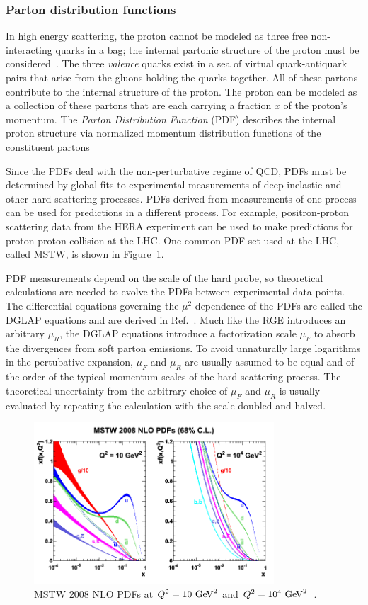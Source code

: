 \subsubsection{Parton distribution functions}

In high energy scattering, the proton cannot be modeled as three free non-interacting quarks in a bag; the internal partonic structure of the proton must be considered~\cite{PDG,Campbell:2006wx}. The three \emph{valence} quarks exist in a sea of virtual quark-antiquark pairs that arise from the gluons holding the quarks together. All of these partons contribute to the internal structure of the proton. The proton can be modeled as a collection of these partons that are each carrying a fraction $x$ of the proton's momentum. The \emph{Parton Distribution Function} (PDF) describes the internal proton structure via normalized momentum distribution functions of the constituent partons

 Since the PDFs deal with the non-perturbative regime of QCD, PDFs must be determined by global fits to experimental measurements of deep inelastic and other hard-scattering processes. PDFs derived from measurements of one process can be used for predictions in a different process. For example, positron-proton scattering data from the HERA experiment can be used to make predictions for proton-proton collision at the LHC. One common PDF set used at the LHC, called MSTW, is shown in Figure~\ref{fig:mstw}.

PDF measurements depend on the scale of the hard probe, so theoretical calculations are needed to evolve the PDFs between experimental data points. The differential equations governing the $\mu^2$ dependence of the PDFs are called the DGLAP equations and are derived in Ref.~\cite{Altarelli:1977zs}. Much like the RGE introduces an arbitrary $\mu_R$, the DGLAP equations introduce a factorization scale $\mu_F$ to absorb the divergences from soft parton emissions. To avoid unnaturally large logarithms in the pertubative expansion,  $\mu_F$ and $\mu_R$ are usually assumed to be equal and of the order of the typical momentum scales of the hard scattering process. The theoretical uncertainty from the arbitrary choice of $\mu_F$ and $\mu_R$ is usually evaluated by repeating the calculation with the scale doubled and halved.
\begin{figure}[h]
\centering
\includegraphics[width=0.8\textwidth]{fig/thry/mstw.png}
\caption{MSTW 2008 NLO PDFs at $Q^2= 10 \gev^2$ and $Q^2= 10^4 \gev^2$~\cite{mstw}.}
\label{fig:mstw}
\end{figure}


